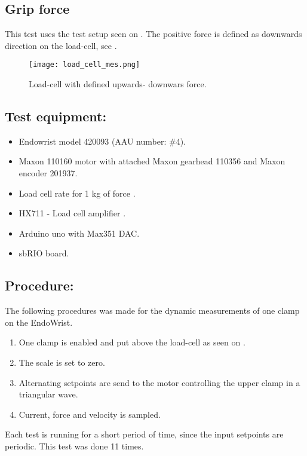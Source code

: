 \subsection{Grip force} %

This test uses the test setup seen on . The positive force is defined as downwards direction on the load-cell, see .

\begin{figure}[H]
	\centering
	\texttt{[image: load\_cell\_mes.png]}
	\caption{Load-cell with defined upwards- downwars force.}
	\label{fig:mes_up_down1}
\end{figure}


\subsection*{Test equipment:}
\begin{itemize}
\item Endowrist model 420093 (AAU number: \#4).
\item Maxon 110160 motor with attached Maxon gearhead 110356 and Maxon encoder 201937.
\item Load cell rate for 1 kg of force \cite{Load_cell_1kg}.
\item HX711 - Load cell amplifier \cite{HX711}.
\item Arduino uno with Max351 DAC.
\item sbRIO board.
\end{itemize}

\subsection*{Procedure:}
The following procedures was made for the dynamic measurements of one clamp on the EndoWrist.

\begin{enumerate}
\item One clamp is enabled and put above the load-cell as seen on .
\item The scale is set to zero.
\item Alternating setpoints are send to the motor controlling the upper clamp in a triangular wave.
\item Current, force and velocity is sampled.
\end{enumerate}
Each test is running for a short period of time, since the input setpoints are periodic. This test was done 11 times.

